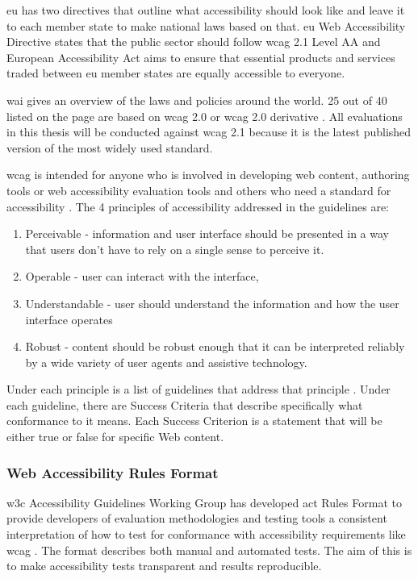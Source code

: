 \documentclass{master_thesis}
\begin{document}
\ac{eu} has two directives that outline what accessibility should look like and leave it to each member state to make national laws based on that. \ac{eu} Web Accessibility Directive states that the public sector should follow \ac{wcag} 2.1 Level AA and European Accessibility Act aims to ensure that essential products and services traded between \ac{eu} member states are equally accessible to everyone.

\ac{wai} gives an overview of the laws and policies around the world. 25 out of 40 listed on the page are based on \ac{wcag} 2.0 or \ac{wcag} 2.0 derivative \citep{Mueller2018}. All evaluations in this thesis will be conducted against \ac{wcag} 2.1 because it is the latest published version of the most widely used standard.

\ac{wcag} is intended for anyone who is involved in developing web content, authoring tools or web accessibility evaluation tools and others who need a standard for accessibility \citep{Henry2023}. The 4 principles of accessibility addressed in the guidelines are:
\begin{enumerate}
	\item Perceivable - information and user interface should be presented in a way that users don't have to rely on a single sense to perceive it.
	\item Operable - user can interact with the interface,
	\item Understandable - user should understand the information and how the user interface operates
	\item Robust - content should be robust enough that it can be interpreted reliably by a wide variety of user agents and assistive technology.
\end{enumerate}
Under each principle is a list of guidelines that address that principle \citep{AGWGWP2022}. Under each guideline, there are Success Criteria that describe specifically what conformance to it means. Each Success Criterion is a statement that will be either true or false for specific Web content.

\subsubsection{Web Accessibility Rules Format}

\ac{w3c} Accessibility Guidelines Working Group has developed \ac{act} Rules Format to provide developers of evaluation methodologies and testing tools a consistent interpretation of how to test for conformance with accessibility requirements like \ac{wcag} \citep{Fiers2019}. The format describes both manual and automated tests. The aim of this is to make accessibility tests transparent and results reproducible.
\end{document}

